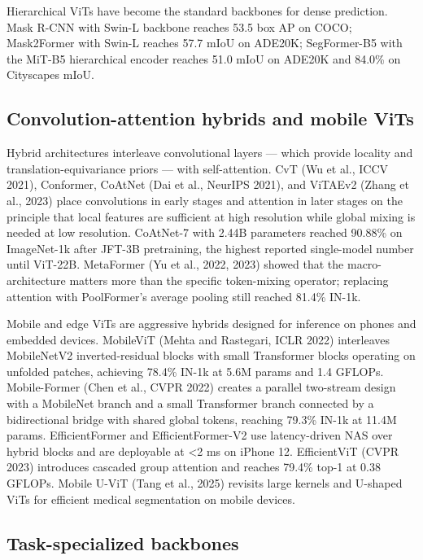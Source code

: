 Hierarchical ViTs have become the standard backbones for dense prediction. Mask R-CNN with Swin-L backbone reaches 53.5 box AP on COCO; Mask2Former with Swin-L reaches 57.7 mIoU on ADE20K; SegFormer-B5 with the MiT-B5 hierarchical encoder reaches 51.0 mIoU on ADE20K and 84.0\% on Cityscapes mIoU.

\subsection{Convolution-attention hybrids and mobile ViTs}\label{convolution-attention-hybrids-and-mobile-vits}

Hybrid architectures interleave convolutional layers --- which provide locality and translation-equivariance priors --- with self-attention. CvT (Wu et al., ICCV 2021), Conformer, CoAtNet (Dai et al., NeurIPS 2021), and ViTAEv2 (Zhang et al., 2023) place convolutions in early stages and attention in later stages on the principle that local features are sufficient at high resolution while global mixing is needed at low resolution. CoAtNet-7 with 2.44B parameters reached 90.88\% on ImageNet-1k after JFT-3B pretraining, the highest reported single-model number until ViT-22B. MetaFormer (Yu et al., 2022, 2023) showed that the macro-architecture matters more than the specific token-mixing operator; replacing attention with PoolFormer's average pooling still reached 81.4\% IN-1k.

Mobile and edge ViTs are aggressive hybrids designed for inference on phones and embedded devices. MobileViT (Mehta and Rastegari, ICLR 2022) interleaves MobileNetV2 inverted-residual blocks with small Transformer blocks operating on unfolded patches, achieving 78.4\% IN-1k at 5.6M params and 1.4 GFLOPs. Mobile-Former (Chen et al., CVPR 2022) creates a parallel two-stream design with a MobileNet branch and a small Transformer branch connected by a bidirectional bridge with shared global tokens, reaching 79.3\% IN-1k at 11.4M params. EfficientFormer and EfficientFormer-V2 use latency-driven NAS over hybrid blocks and are deployable at \textless2 ms on iPhone 12. EfficientViT (CVPR 2023) introduces cascaded group attention and reaches 79.4\% top-1 at 0.38 GFLOPs. Mobile U-ViT (Tang et al., 2025) revisits large kernels and U-shaped ViTs for efficient medical segmentation on mobile devices.

\subsection{Task-specialized backbones}\label{task-specialized-backbones}

